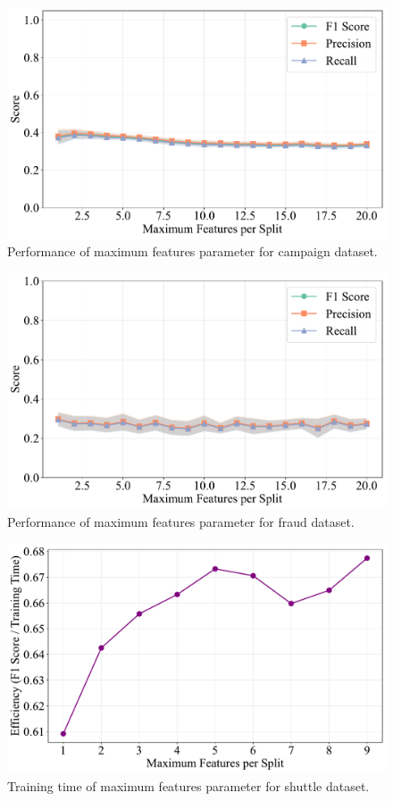 \documentclass[10pt, conference]{IEEEtran}
\begin{document}
\begin{figure}[H]
	\centering
	\includegraphics[width=0.95\linewidth]{../results/campaign/max_features/performance_vs_max_features.pdf}
	\caption{Performance of maximum features parameter for campaign dataset.}
	\label{fig:max_features_campaign}
\end{figure}

\begin{figure}[H]
	\centering
	\includegraphics[width=0.95\linewidth]{../results/fraud/max_features/performance_vs_max_features.pdf}
	\caption{Performance of maximum features parameter for fraud dataset.}
	\label{fig:max_features_fraud}
\end{figure}



\begin{figure}[H]
	\centering
	\includegraphics[width=0.95\linewidth]{../results/shuttle/max_features/efficiency_vs_max_features.pdf}
	\caption{Training time of maximum features parameter for shuttle dataset.}
	\label{fig:max_features_tt_shuttle}
\end{figure}
\end{document}
